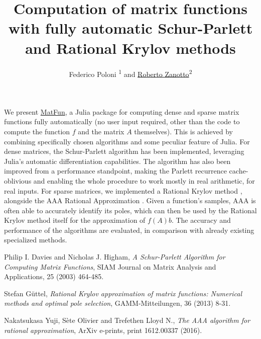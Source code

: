 \documentclass{paper}
\newcommand{\indexauthors}[1]{%
        \forcsvlist{\index}{#1}}
\begin{document}
\title{Computation of matrix functions with fully automatic Schur-Parlett and Rational Krylov methods}
\author{Federico Poloni \textsuperscript{1}
        and \underline{Roberto Zanotto}\textsuperscript{2}}


\indexauthors{Poloni!Federico, Zanotto!Roberto}
\maketitle

We present \href{https://github.com/robzan8/MatFun.jl}{MatFun}, a Julia package for computing dense and sparse matrix functions fully automatically (no user input required, other than the code to compute the function \(f\) and the matrix \(A\) themselves). This is achieved by combining specifically chosen algorithms and some peculiar feature of Julia. For dense matrices, the Schur-Parlett algorithm \cite{label:1} has been implemented, leveraging Julia's automatic differentiation capabilities. The algorithm has also been improved from a performance standpoint, making the Parlett recurrence cache-oblivious and enabling the whole procedure to work mostly in real arithmetic, for real inputs. For sparse matrices, we implemented a Rational Krylov method \cite{label:2}, alongside the AAA Rational Approximation \cite{label:3}. Given a function's samples, AAA is often able to accurately identify its poles, which can then be used by the Rational Krylov method itself for the approximation of \(f(A)b\). The accuracy and performance of the algorithms are evaluated, in comparison with already existing specialized methods.

\small
\begin{thebibliography}{10}

 Philip I. Davies and Nicholas J. Higham,
\textit{A Schur-Parlett Algorithm for Computing Matrix Functions},
SIAM Journal on Matrix Analysis and Applications, 25 (2003) 464-485.

 Stefan G{\"u}ttel,
\textit{Rational Krylov approximation of matrix functions: Numerical methods and optimal pole selection},
GAMM-Mitteilungen, 36 (2013) 8-31.

 Nakatsukasa Yuji, S{\`e}te Olivier and Trefethen Lloyd N.,
\textit{The AAA algorithm for rational approximation},
ArXiv e-prints, print 1612.00337 (2016).

\end{thebibliography}
\end{document}
